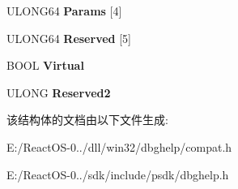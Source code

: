 \begin{DoxyCompactItemize}
U\+L\+O\+N\+G64 {\bfseries Params} \mbox{[}4\mbox{]}
\item 
\mbox{\label{struct___i_m_a_g_e_h_l_p___s_t_a_c_k___f_r_a_m_e_a957898129a9af8948ebeb05706d5b901}} 
U\+L\+O\+N\+G64 {\bfseries Reserved} \mbox{[}5\mbox{]}
\item 
\mbox{\label{struct___i_m_a_g_e_h_l_p___s_t_a_c_k___f_r_a_m_e_a4f6c3946140a7d95fc9a0fcfb2b3ed97}} 
B\+O\+OL {\bfseries Virtual}
\item 
\mbox{\label{struct___i_m_a_g_e_h_l_p___s_t_a_c_k___f_r_a_m_e_af17f7606a2fedb4f87898e60f3613ba2}} 
U\+L\+O\+NG {\bfseries Reserved2}
\end{DoxyCompactItemize}


该结构体的文档由以下文件生成\+:\begin{DoxyCompactItemize}
\item 
E\+:/\+React\+O\+S-\/0../dll/win32/dbghelp/compat.\+h\item 
E\+:/\+React\+O\+S-\/0../sdk/include/psdk/dbghelp.\+h\end{DoxyCompactItemize}
